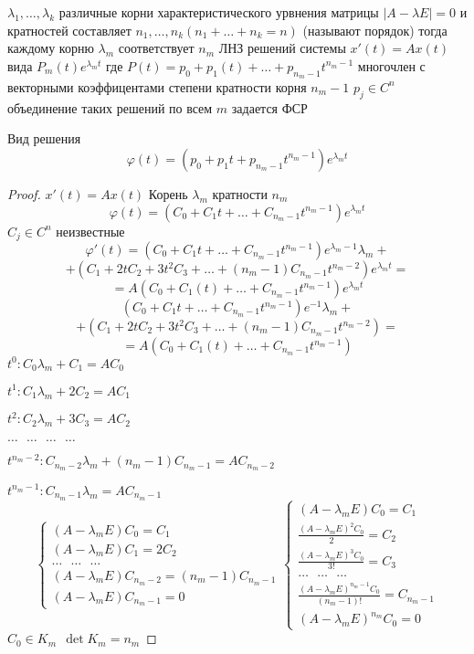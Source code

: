 \begin{theorem}
  $\lambda_1, \ldots, \lambda_k$ различные корни характеристического урвнения
  матрицы $|A - \lambda E| = 0$ и кратностей составляет $n_1, \ldots, n_k
  (n_1 + \ldots + n_k = n)$ (называют порядок) тогда каждому корню $\lambda_m$
  соответствует $n_m$ ЛНЗ решений системы $x'(t) = Ax(t)$ вида $P_m(t)
  e^{\lambda_m t}$ где $P(t) = p_0 + p_1(t) + \ldots + p_{n_m-1}t^{n_m-1}$
  многочлен с векторными коэффицентами степени кратности корня $n_m - 1$
  $p_j \in C^n$ объединение таких решений по всем $m$ задается ФСР

  Вид решения
  $$
  \varphi(t) = (p_0 + p_1t + p_{n_m-1}t^{n_m-1})e^{\lambda_m t}
  $$
\end{theorem}

\begin{proof}
  $x'(t) = Ax(t)$ Корень $\lambda_m$ кратности $n_m$
  $$
  \varphi(t) = (C_0 + C_1 t + \ldots + C_{n_m-1}t^{n_m-1})e^{\lambda_m t}
  $$
  $C_j \in C^n$ неизвестные
  $$
  \varphi'(t) = (C_0 + C_1 t + \ldots + C_{n_m-1}t^{n_m-1})e^{\lambda_m - 1}
  \lambda_m +
  $$
  $$
  + (C_1 + 2tC_2 + 3t^2C_3 + \ldots + (n_m-1)C_{n_m-1}t^{n_m-2})
  e^{\lambda_m t} =
  $$
  $$
  = A(C_0 + C_1(t) + \ldots + C_{n_m-1}t^{n_m-1}) e^{\lambda_m t}
  $$
  $$
 (C_0 + C_1 t + \ldots + C_{n_m-1}t^{n_m-1})e^{-1}\lambda_m +
  $$
  $$
  + (C_1 + 2tC_2 + 3t^2C_3 + \ldots + (n_m-1)C_{n_m-1}t^{n_m-2}) =
  $$
  $$
  = A(C_0 + C_1(t) + \ldots + C_{n_m-1}t^{n_m-1})
  $$
  $t^0 : C_0 \lambda_m + C_1 = AC_0$

  $t^1 : C_1 \lambda_m + 2C_2 = AC_1$

  $t^2 : C_2 \lambda_m + 3C_3 = AC_2$

  $\ldots ~~~ \ldots ~~~ \ldots ~~~ \ldots$

  $t^{n_m-2} : C_{n_m-2} \lambda_m + (n_m - 1)C_{n_m - 1} = AC_{n_m - 2}$

  $t^{n_m-1} : C_{n_m-1} \lambda_m = AC_{n_m - 1}$
  $$
  \left\{
  \begin{array}{l}
    (A - \lambda_mE) C_0 = C_1 \\
    (A - \lambda_mE) C_1 = 2C_2 \\
    \ldots ~~~ \ldots ~~~ \ldots \\
    (A - \lambda_mE) C_{n_m-2} = (n_m-1)C_{n_m-1} \\
    (A - \lambda_mE) C_{n_m-1} = 0
  \end{array}
  \right.
  \left\{
  \begin{array}{l}
    (A - \lambda_mE) C_0 = C_1 \\
    \frac{(A - \lambda_mE)^2 C_0}{2} = C_2 \\
    \frac{(A - \lambda_mE)^3 C_0}{3!} = C_3 \\
    \ldots ~~~ \ldots ~~~ \ldots \\
    \frac{(A - \lambda_mE)^{n_m-1} C_0}{(n_m-1)!} = C_{n_m-1} \\
    (A - \lambda_mE)^{n_m}C_0 = 0
  \end{array}
  \right.
  $$
  $C_0 \in K_m ~~ \det K_m = n_m$


\end{proof}
